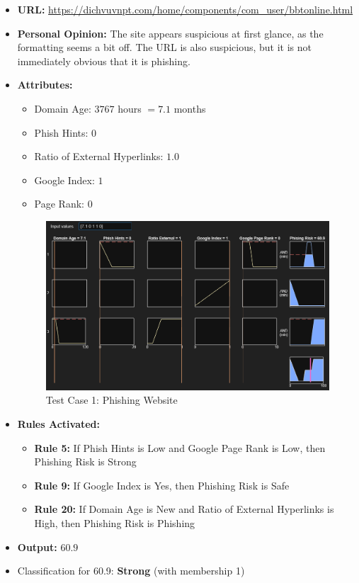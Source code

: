 \documentclass[11pt]{article}
\begin{document}
\begin{itemize}
    \item \textbf{URL:} \url{https://dichvuvnpt.com/home/components/com_user/bbtonline.html}
    \item \textbf{Personal Opinion:} The site appears suspicious at first glance, as the formatting seems a bit off. The URL is also suspicious, but it is not immediately obvious that it is phishing.
    \item \textbf{Attributes:}
    \begin{itemize}
        \item Domain Age: $3767$ hours $= 7.1$ months
        \item Phish Hints: $0$
        \item Ratio of External Hyperlinks: $1.0$
        \item Google Index: $1$
        \item Page Rank: $0$
    \end{itemize}
    \begin{figure}[h!]
        \centering
        \includegraphics[width=\textwidth]{test-1.png}
        \caption{Test Case 1: Phishing Website}
    \end{figure}
    \item \textbf{Rules Activated:} 
    \begin{itemize}
        \item \textbf{Rule 5:} If Phish Hints is Low and Google Page Rank is Low, then Phishing Risk is Strong
        \item \textbf{Rule 9:} If Google Index is Yes, then Phishing Risk is Safe
        \item \textbf{Rule 20:} If Domain Age is New and Ratio of External Hyperlinks is High, then Phishing Risk is Phishing
    \end{itemize}
    \item \textbf{Output:} $60.9$
    \item Classification for 60.9: \textbf{Strong} (with membership 1)
\end{itemize}
\end{document}
